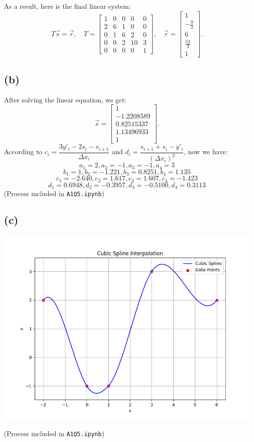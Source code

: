 \documentclass{article}
\begin{document}
As a result, here is the final linear system:
$$
    T \vec{s} = \vec{r}, \quad
    T =
    \begin{bmatrix}
        1 & 0 & 0 & 0  & 0 \\
        2 & 6 & 1 & 0  & 0 \\
        0 & 1 & 6 & 2  & 0 \\
        0 & 0 & 2 & 10 & 3 \\
        0 & 0 & 0 & 0  & 1
    \end{bmatrix}, \quad
    \vec{r} =
    \begin{bmatrix}
        1            \\
        -\frac{9}{2} \\
        6            \\
        \frac{52}{3} \\
        1
    \end{bmatrix}.
$$

\subsection*{(b)}
After solving the linear equation, we get:
$$
    \vec{s} =
    \begin{bmatrix}
        1          \\
        -1.2208589 \\
        0.82515337 \\
        1.13496933 \\
        1
    \end{bmatrix}.
$$
According to $c_i=\dfrac{3y'_i-2s_i-s_{i+1}}{\Delta x_i}$ and $d_i=\dfrac{s_{i+1}+s_i-y'_i}{(\Delta x_i)^2}$, now we have:
$$
    a_1=2, a_2=-1, a_3=-1, a_4=3
$$
$$
    b_1=1, b_2=-1.221, b_3=0.8251, b_4=1.135
$$
$$
    c_1=-2.640, c_2=1.617, c_3=1.607, c_4=-1.423
$$
$$
    d_1=0.6948, d_2=-0.3957, d_3=-0.5100, d_4=0.3113
$$
(Process included in \texttt{A1Q5.ipynb})

\subsection*{(c)}
\begin{center}
    \includegraphics[scale=0.78, keepaspectratio]{q5c.png}
\end{center}
(Process included in \texttt{A1Q5.ipynb})
\end{document}
